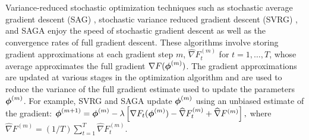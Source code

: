 Variance-reduced stochastic optimization techniques such as stochastic average gradient descent (SAG) \citep{Schmidt:2017}, stochastic variance reduced gradient descent (SVRG) \citep{Johnson:2013}, and SAGA \citep{Defazio:2014} enjoy the speed of stochastic gradient descent as well as the convergence rates of full gradient descent. These algorithms involve storing gradient approximations at each gradient step $m$, $\widehat \nabla F_{t}^{(m)}$ for $t = 1,\ldots,T$, whose average approximates the full gradient $\nabla F(\boldsymbol{\phi}^{(m)})$. The gradient approximations are updated at various stages in the optimization algorithm and are used to reduce the variance of the full gradient estimate used to update the parameters $\boldsymbol{\phi}^{(m)}$. 
%
%
For example, SVRG and SAGA update $\boldsymbol{\phi}^{(m)}$ using an unbiased estimate of the gradient:
%
    $\boldsymbol{\phi}^{(m+1)} = \boldsymbol{\phi}^{(m)} - \lambda \left[\nabla F_{t}(\boldsymbol{\phi}^{(m)}) - \widehat \nabla F_{t}^{(m)} + \widehat \nabla F^{(m)} \right],$
%
where
%
    $\widehat \nabla F^{(m)} = (1/T) \sum_{t=1}^T \widehat \nabla F_{t}^{(m)}$.
%
